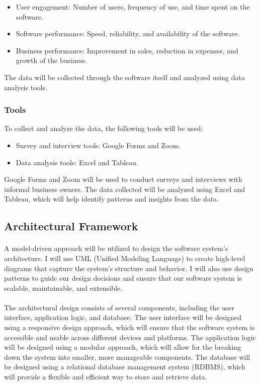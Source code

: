 \documentclass{article}
\begin{document}
\begin{itemize}
    \item User engagement: Number of users, frequency of use, and time spent on the software.
    \item Software performance: Speed, reliability, and availability of the software.
    \item Business performance: Improvement in sales, reduction in expenses, and growth of the business.
\end{itemize}

The data will be collected through the software itself and analyzed using data analysis tools. 

\subsubsection{Tools}
To collect and analyze the data, the following tools will be used:

\begin{itemize}
    \item Survey and interview tools: Google Forms and Zoom.
    \item Data analysis tools: Excel and Tableau.
\end{itemize}

Google Forms and Zoom will be used to conduct surveys and interviews with informal business owners. The data collected will be analyzed using Excel and Tableau, which will help identify patterns and insights from the data.
\newpage


\subsection{Architectural Framework}

\paragraph*{}
A model-driven approach will be utilized to design the software system's architecture. I will use UML (Unified Modeling Language) to create high-level diagrams that capture the system's structure and behavior. I will also use design patterns to guide our design decisions and ensure that our software system is scalable, maintainable, and extensible.

\paragraph*{}
The architectural design consists of several components, including the user interface, application logic, and database. The user interface will be designed using a responsive design approach, which will ensure that the software system is accessible and usable across different devices and platforms. The application logic will be designed using a modular approach, which  will allow for the breaking down the system into smaller, more manageable components. The database will be designed using a relational database management system (RDBMS), which will provide a flexible and efficient way to store and retrieve data.
\end{document}
